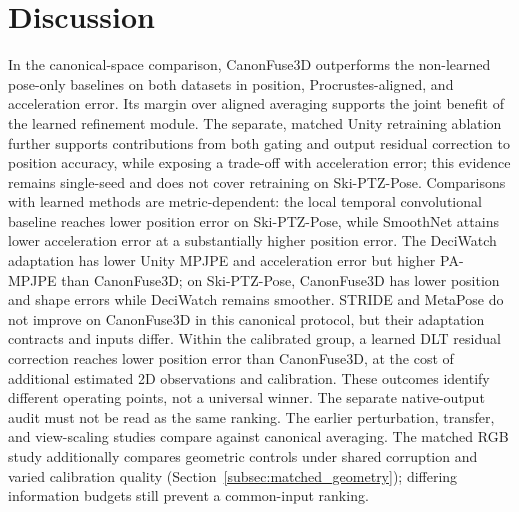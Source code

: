 \documentclass[preprint,12pt]{elsarticle}
\begin{document}
\FloatBarrier
\section{Discussion}
\label{sec:discussion}

In the canonical-space comparison, CanonFuse3D outperforms the non-learned pose-only baselines on both datasets in position, Procrustes-aligned, and acceleration error. Its margin over aligned averaging supports the joint benefit of the learned refinement module. The separate, matched Unity retraining ablation further supports contributions from both gating and output residual correction to position accuracy, while exposing a trade-off with acceleration error; this evidence remains single-seed and does not cover retraining on Ski-PTZ-Pose. Comparisons with learned methods are metric-dependent: the local temporal convolutional baseline reaches lower position error on Ski-PTZ-Pose, while SmoothNet attains lower acceleration error at a substantially higher position error. The DeciWatch adaptation has lower Unity MPJPE and acceleration error but higher PA-MPJPE than CanonFuse3D; on Ski-PTZ-Pose, CanonFuse3D has lower position and shape errors while DeciWatch remains smoother. STRIDE and MetaPose do not improve on CanonFuse3D in this canonical protocol, but their adaptation contracts and inputs differ. Within the calibrated group, a learned DLT residual correction reaches lower position error than CanonFuse3D, at the cost of additional estimated 2D observations and calibration. These outcomes identify different operating points, not a universal winner. The separate native-output audit must not be read as the same ranking. The earlier perturbation, transfer, and view-scaling studies compare against canonical averaging. The matched RGB study additionally compares geometric controls under shared corruption and varied calibration quality (Section~\ref{subsec:matched_geometry}); differing information budgets still prevent a common-input ranking.
\end{document}
